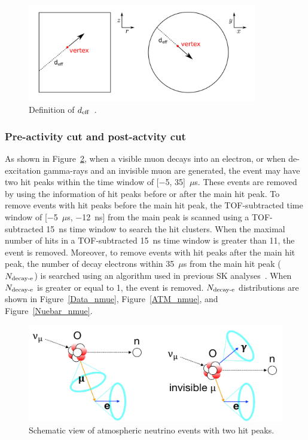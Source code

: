 \begin{figure}[h]
	\centering
	\includegraphics[width=10cm]{Figures/Selection/effwall}
	\caption[Definition of $d_{\rm eff}$]{
	Definition of $d_{\rm eff}$~\cite{2021Abe}.
	}\label{effwall}
\end{figure}

\subsubsection{Pre-activity cut and post-actvity cut}
\vs\hs
As shown in Figure~\ref{Selection_CC_numu_visible_CC_numu_02}, when a visible muon decays into an electron, or when de-excitation gamma-rays and an invisible muon are generated, the event may have two hit peaks within the time window of [$-$5, 35]~$\mu$s.
These events are removed by using the information of hit peaks before or after the main hit peak.
To remove events with hit peaks before the main hit peak, the TOF-subtracted time window of [$-$5~$\mu$s, $-$12~ns] from the main peak is scanned using a TOF-subtracted 15~ns time window to search the hit clusters.
When the maximal number of hits in a TOF-subtracted 15~ns time window is greater than 11, the event is removed.
Moreover, to remove events with hit peaks after the main hit peak, the number of decay electrons within 35~$\mu$s from the main hit peak ($N_{\rm decay\mathchar`-e}$) is searched using an algorithm used in previous SK analyses~\cite{2017Abe}.
When $N_{\rm decay\mathchar`-e}$ is greater or equal to 1, the event is removed.
$N_{\rm decay\mathchar`-e}$ distributions are shown in Figure~\ref{Data_nmue}, Figure~\ref{ATM_nmue}, and Figure~\ref{Nuebar_nmue}.

\begin{figure}[h]
	\centering
	\includegraphics[width=12cm]{Figures/Selection/CC_numu_visible_CC_numu_02}
	\caption[Schematic view of atmospheric neutrino events with two hit peaks]{
	Schematic view of atmospheric neutrino events with two hit peaks.
	}\label{Selection_CC_numu_visible_CC_numu_02}
\end{figure}

